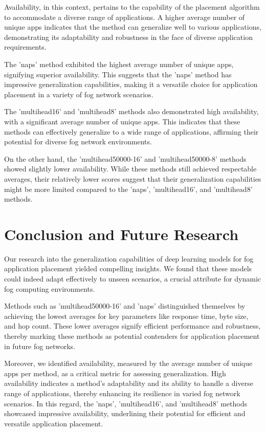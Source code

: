 \documentclass[conference]{IEEEtran}
\begin{document}
Availability, in this context, pertains to the capability of the placement algorithm to accommodate a diverse range of applications. A higher average number of unique apps indicates that the method can generalize well to various applications, demonstrating its adaptability and robustness in the face of diverse application requirements.

The 'naps' method exhibited the highest average number of unique apps, signifying superior availability. This suggests that the 'naps' method has impressive generalization capabilities, making it a versatile choice for application placement in a variety of fog network scenarios.

The 'multihead16' and 'multihead8' methods also demonstrated high availability, with a significant average number of unique apps. This indicates that these methods can effectively generalize to a wide range of applications, affirming their potential for diverse fog network environments.

On the other hand, the 'multihead50000-16' and 'multihead50000-8' methods showed slightly lower availability. While these methods still achieved respectable averages, their relatively lower scores suggest that their generalization capabilities might be more limited compared to the 'naps', 'multihead16', and 'multihead8' methods.


\section{Conclusion and Future Research}

Our research into the generalization capabilities of deep learning models for fog application placement yielded compelling insights. We found that these models could indeed adapt effectively to unseen scenarios, a crucial attribute for dynamic fog computing environments.

Methods such as 'multihead50000-16' and 'naps' distinguished themselves by achieving the lowest averages for key parameters like response time, byte size, and hop count. These lower averages signify efficient performance and robustness, thereby marking these methods as potential contenders for application placement in future fog networks.

Moreover, we identified availability, measured by the average number of unique apps per method, as a critical metric for assessing generalization. High availability indicates a method's adaptability and its ability to handle a diverse range of applications, thereby enhancing its resilience in varied fog network scenarios. In this regard, the 'naps', 'multihead16', and 'multihead8' methods showcased impressive availability, underlining their potential for efficient and versatile application placement.
\end{document}

